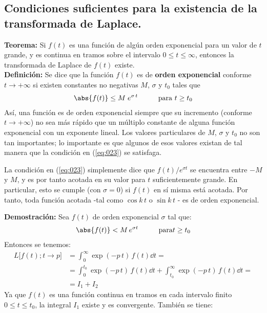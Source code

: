 \subsection{Condiciones suficientes para la existencia de la transformada de Laplace.}

\noindent \textbf{Teorema: } Si $f(t)$ es una función de algún orden exponencial para un valor de $t$ grande, y es continua en tramos sobre el intervalo $0 \leq t \leq \infty$, entonces la transformada de Laplace de $f(t)$ existe.
\\[0.5em]
\textbf{Definición: } Se dice que la función $f(t)$ es de \textbf{orden exponencial} conforme $t \to + \infty$ si existen constantes no negativas $M$, $\sigma$ y $t_{0}$ tales que
\begin{align}
\abs{f(t)} \leq M \; e^{\sigma \, t} \hspace{1cm} \mbox{para } t \geq t_{0}
\label{eq:023}
\end{align}
Así, una función es de orden exponencial siempre que su incremento (conforme $t \to + \infty$) no sea más rápido que un múltiplo constante de alguna función exponencial con un exponente lineal. Los valores particulares de $M$, $\sigma$ y $t_{0}$ no son tan importantes; lo importante es que algunos de esos valores existan de tal manera que la condición en (\ref{eq:023}) se satisfaga.
\par
La condición en (\ref{eq:023}) simplemente dice que $f(t) / e^{\sigma t}$ se encuentra entre $-M$ y $M$, y es por tanto acotada en su valor para $t$ suficientemente grande. En particular, esto se cumple (con $\sigma = 0$) si $f(t)$ en sí misma está acotada. Por tanto, toda función acotada -tal como $\cos k \, t$ o $\sin k \, t$ - es de orden exponencial.
\par
\noindent \textbf{Demostración: } Sea $f(t)$ de orden exponencial $\sigma$ tal que:
\begin{align*}
\abs{f(t)} < M \, e^{\sigma t} \hspace{1cm} \mbox{para} t \geq t_{0}
\end{align*}
Entonces se tenemos:
\begin{align*}
L \big[f(t); t \to p\big] &= \int_{0}^{\infty} \exp(-p \, t) \, f(t) \dd{t} = \\[0.5em]
&= \int_{0}^{t_{0}} \exp(-p \, t) \, f(t) \dd{t} + \int_{t_{0}}^{\infty} \exp(-p \, t) \, f(t) \dd{t} = \\[0.5em]
&= I_{1} + I_{2}
\end{align*}
Ya que $f(t)$ es una función continua en tramos en cada intervalo finito $0 \leq t \leq t_{0}$, la integral $I_{1}$ existe y es convergente. También se tiene:
